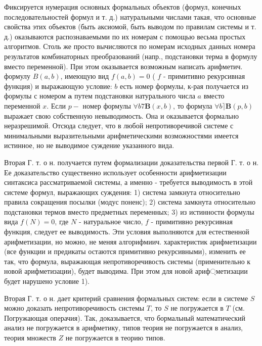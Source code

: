 \documentclass[10pt]{article}
\begin{document}
Фиксируется нумерация основных формальных объектов (формул, конечных последовательностей формул и т. д.) натуральными числами такая, что основные свойства этих объектов (быть аксиомой, быть выводом по правилам системы и т. д.) оказываются распознаваемыми по их номерам с помощью весьма простых алгоритмов. Столь же просто вычисляются по номерам исходных данных номера результатов комбинаторных преобразований (напр., подстановки терма в формулу вместо переменной). При этом оказывается возможным написать арифметич. формулу $B(a, b)$, имеющую вид $f(a, b)=0$ ( $f$ - примитивно рекурсивная функция) и выражающую условие: $b$ есть номер формулы, к-рая получается из формулы с номером $\boldsymbol{a}$ путем подстановки натурального числа $a$ вместо переменной $x$. Если $p-$ номер формулы $\forall b 7 \boldsymbol{B}(x, b)$, то формула $\forall b\rceil \boldsymbol{B}(p, b)$ выражает свою собственную невыводимость. Она и оказывается формально неразрешимой. Отсюда следует, что в любой непротиворечивой системе с минимальными выразительными арифметическими возможностями имеется истинное, но не выводимое суждение указанного вида.



Вторая Г. т. о н. получается путем формализации доказательства первой Г. т. о н. Ее доказательство существенно использует особенности арифметизации синтаксиса рассматриваемой системы, а именно - требуется выводимость в этой системе формул, выражающих суждения: 1) система замкнута относительно правила сокращения посылки (модус поненс); 2) система замкнута относительно подстановки термов вместо предметных переменных; 3) из истинности формулы вида $f(N)=0$, где $N$ - натуральное число, $f$ - примитивно рекурсивная функция, следует ее выводимость. Эти условия выполняются для естественной арифметизации, но можно, не меняя алгорифмиич. характеристик арифметизации (все функции и предикаты остаются примитивно рекурсивными), изменить ее так, что формула, выражающая непротиворечивость системы (применительно к новой арифметизации), будет выводима. При этом для новой ариф্метизации будет нарушено условие 1).



Вторая Г. т. о н. дает критерий сравнения формальных систем: если в системе $S$ можно доказать непротиворечивость системы $T$, то $S$ не погружается в $T$ (см. Погружающая операчия). Так, доказывается, что бормальный математический анализ не погружается в арифметику, типов теория не погружается в анализ, теория множеств $Z$ не погружается в теорию типов.
\end{document}
